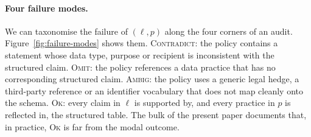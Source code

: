 \documentclass[11pt,a4paper]{article}
\begin{document}
\paragraph{Four failure modes.}
We can taxonomise the failure of $(\ell, p)$ along the four corners of an
audit. Figure~\ref{fig:failure-modes} shows them. \textsc{Contradict}: the
policy contains a statement whose data type, purpose or recipient is
inconsistent with the structured claim. \textsc{Omit}: the policy
references a data practice that has no corresponding structured claim.
\textsc{Ambig}: the policy uses a generic legal hedge, a third-party
reference or an identifier vocabulary that does not map cleanly onto the
schema. \textsc{Ok}: every claim in $\ell$ is supported by, and every
practice in $p$ is reflected in, the structured table. The bulk of the
present paper documents that, in practice, \textsc{Ok} is far from the
modal outcome.
\end{document}
